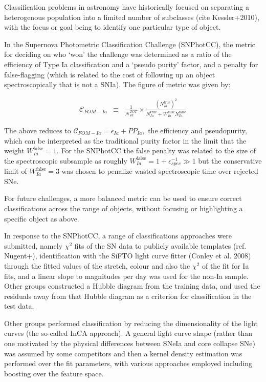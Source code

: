 Classification problems in astronomy have historically focused on separating a heterogenous population into a limited number of subclasses (cite Kessler+2010), with the focus or goal being to identify one particular type of object.

In the Supernova Photometric Classification Challenge (SNPhotCC), the metric for deciding on who `won' the challenge was determined as a ratio of the efficiency of Type Ia classification and a `pseudo purity' factor, and a penalty for false-flagging (which is related to the cost of following up an object spectroscopically that is not a SNIa). The figure of metric was given by:

\begin{eqnarray}
\mathcal{C}_{FOM-Ia} &\equiv& \frac{1}{\mathcal{N}_{Ia}^{TOT}}\times \frac{(N_{Ia}^{\mathrm{true}})^2}{N_{Ia}^\mathrm{true}+W_{Ia}^\mathrm{false}N_{Ia}^\mathrm{false}}
\end{eqnarray}

The above reduces to $\mathcal{C}_{FOM-Ia}  = \epsilon_{Ia} + PP_{Ia},$ the efficiency and pseudopurity, which can be interpreted as the traditional purity factor in the limit that the weight $W_{Ia}^\mathrm{false} = 1$. For the SNPhotCC the false penalty was related to the size of the spectroscopic subsample as roughly $W_{Ia}^\mathrm{false} = 1 + \epsilon_{spec}^{-1} \gg 1$ but the conservative limit of $W_{Ia}^\mathrm{false} = 3$ was chosen to penalize wasted spectroscopic time over rejected SNe.

For future challenges, a more balanced metric can be used to ensure correct classifications across the range of objects, without focusing or highlighting a specific object as above.




In response to the SNPhotCC, a range of classifications approaches were submitted, namely $\chi^{2}$ fits of the SN data to publicly available templates (ref. Nugent+), identification with the SiFTO light curve fitter (Conley et al. 2008) through the fitted values of the stretch, colour and also the $\chi^{2}$ of the fit for Ia fits, and a linear slope to magnitudes per day was used for the non-Ia sample. Other groups constructed a Hubble diagram from the training data, and used the residuals away from that Hubble diagram as a criterion for classification in the test data.

Other groups performed classification by reducing the dimensionality of the light curves (the so-called InCA approach). A general light curve shape (rather than one motivated by the physical differences between SNeIa and core collapse SNe) was assumed by some competitors and then a kernel density estimation was performed over the fit parameters, with various approaches employed including boosting over the feature space.


